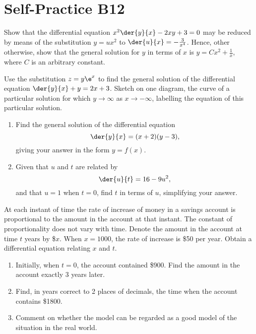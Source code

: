 \section{Self-Practice B12}

\begin{problem}
    Show that the differential equation $x^2 \der{y}{x} - 2xy + 3 = 0$ may be reduced by means of the substitution $y = ux^2$ to $\der{u}{x} = -\frac3{x^4}$. Hence, other otherwise, show that the general solution for $y$ in terms of $x$ is $y = Cx^2 + \frac1x$, where $C$ is an arbitrary constant.
\end{problem}

\begin{problem}
    Use the substitution $z = y \e^x$ to find the general solution of the differential equation $\der{y}{x} + y = 2x + 3$. Sketch on one diagram, the curve of a particular solution for which $y \to \infty$ as $x \to -\infty$, labelling the equation of this particular solution.
\end{problem}

\begin{problem}
    \begin{enumerate}
        \item Find the general solution of the differential equation \[\der{y}{x} = (x+2)(y-3),\] giving your answer in the form $y = f(x)$.
        \item Given that $u$ and $t$ are related by \[\der{u}{t} = 16 - 9u^2,\] and that $u = 1$ when $t = 0$, find $t$ in terms of $u$, simplifying your answer.
    \end{enumerate}
\end{problem}

\begin{problem}
    At each instant of time the rate of increase of money in a savings account is proportional to the amount in the account at that instant. The constant of proportionality does not vary with time. Denote the amount in the account at time $t$ years by \$$x$. When $x = 1000$, the rate of increase is \$50 per year. Obtain a differential equation relating $x$ and $t$. 
    
    \begin{enumerate}
        \item Initially, when $t = 0$, the account contained \$900. Find the amount in the account exactly 3 years later.
        \item Find, in years correct to 2 places of decimals, the time when the account contains \$1800.
        \item Comment on whether the model can be regarded as a good model of the situation in the real world.
    \end{enumerate}
\end{problem}

